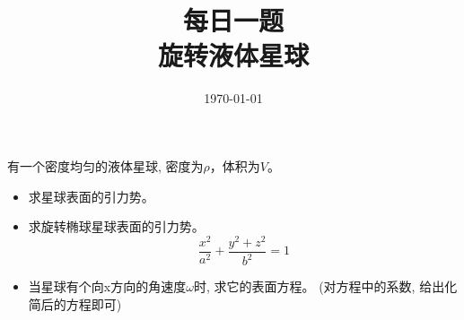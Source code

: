 \documentclass {ctexart}
\title {每日一题\\{\small 旋转液体星球}}
\date{\today}
\begin{document}
    \maketitle {}

    有一个密度均匀的液体星球, 密度为\(\rho\)，体积为\(V\)。
    \begin{itemize}
        \item 求星球表面的引力势。
        \item 求旋转椭球星球表面的引力势。
            \begin{equation}
                \frac{x^2}{a^2}+\frac{y^2+z^2}{b^2}=1
            \end{equation}
        \item 当星球有个向x方向的角速度\(\omega\)时, 求它的表面方程。
            (对方程中的系数, 给出化简后的方程即可)
    \end{itemize}
\end{document}
